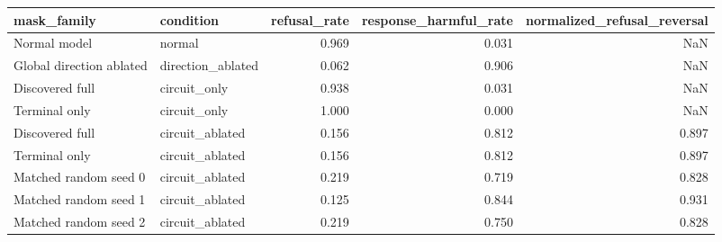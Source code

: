 \begin{tabular}{llrrr}
\toprule
mask\_family & condition & refusal\_rate & response\_harmful\_rate & normalized\_refusal\_reversal \\
\midrule
Normal model & normal & 0.969 & 0.031 & NaN \\
Global direction ablated & direction\_ablated & 0.062 & 0.906 & NaN \\
Discovered full & circuit\_only & 0.938 & 0.031 & NaN \\
Terminal only & circuit\_only & 1.000 & 0.000 & NaN \\
Discovered full & circuit\_ablated & 0.156 & 0.812 & 0.897 \\
Terminal only & circuit\_ablated & 0.156 & 0.812 & 0.897 \\
Matched random seed 0 & circuit\_ablated & 0.219 & 0.719 & 0.828 \\
Matched random seed 1 & circuit\_ablated & 0.125 & 0.844 & 0.931 \\
Matched random seed 2 & circuit\_ablated & 0.219 & 0.750 & 0.828 \\
\bottomrule
\end{tabular}
